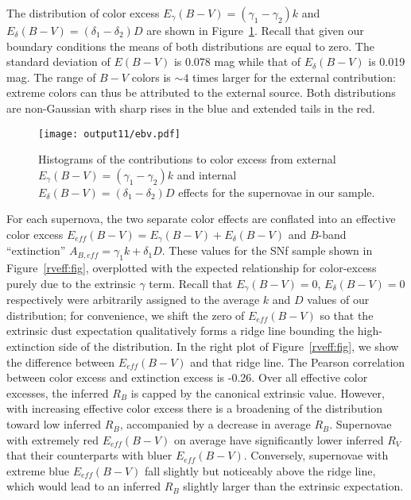 \documentclass{aastex}   	%
\begin{document}
The distribution of color excess $E_\gamma(B-V) =(\gamma_1-\gamma_2)k$ and
 $E_\delta(B-V) = (\delta_1-\delta_2)D$ are shown in Figure~\ref{ebv:fig}.
Recall that given our boundary conditions the means of both distributions are equal to zero. 
The standard deviation of $E(B-V)$ is 0.078 mag while that of $E_\delta(B-V)$ is 0.019 mag.
The range of $B-V$ colors is $\sim 4$ times larger for the external contribution:
extreme colors can thus be attributed to the external source. 
Both distributions are non-Gaussian with sharp rises in the blue and extended tails in the red.
\begin{figure}[htbp] %
   \centering
   \texttt{[image: output11/ebv.pdf]}
   \caption{Histograms of the contributions to color excess from external $E_\gamma(B-V) =(\gamma_1-\gamma_2)k$ and
   internal $E_\delta(B-V) = (\delta_1-\delta_2)D$ effects for the supernovae in our sample.
   \label{ebv:fig}}
\end{figure}

For each supernova, the two separate color effects are conflated into an effective color excess
$E_{eff}(B-V) = E_\gamma(B-V) + E_\delta(B-V)$ and $B$-band ``extinction''
$A_{B, eff} = \gamma_1 k + \delta_1D$.  These values for the SNf sample
shown in Figure~\ref{rveff:fig}, overplotted with the expected relationship for color-excess 
purely due to the extrinsic $\gamma$ term.
Recall that  $E_\gamma(B-V)=0$,  $E_\delta(B-V)=0$ respectively were arbitrarily assigned to the average $k$ and $D$ values of our distribution;
for convenience, we shift the zero of  $E_{eff}(B-V)$ so that the extrinsic dust expectation qualitatively forms a ridge line
bounding the high-extinction side of the distribution.
In the right plot of Figure~\ref{rveff:fig}, we show the difference between $E_{eff}(B-V)$ and that ridge line.
The Pearson correlation between color excess and extinction excess is -0.26.
Over all effective color excesses, the inferred $R_B$  is capped by the canonical extrinsic value.
However, with increasing effective color excess there is a broadening of the distribution toward low inferred $R_B$,
accompanied by a decrease in average  $R_B$.
Supernovae with extremely red $E_{eff}(B-V)$ on average have significantly lower inferred $R_V$ that their counterparts with bluer $E_{eff}(B-V)$.
Conversely, supernovae with extreme
blue  $E_{eff}(B-V)$ fall slightly but noticeably above the ridge line, which would lead to an inferred $R_B$ slightly
larger than the extrinsic expectation.
\end{document}
